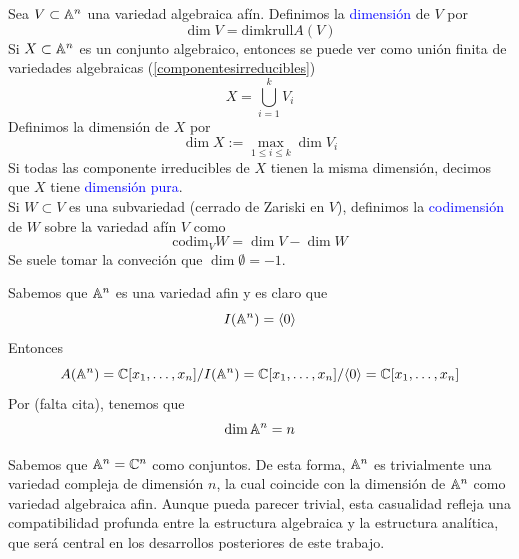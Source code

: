     \begin{definition}
        Sea $V\subset\mathbb{A}^n$ una variedad algebraica afín. Definimos la \textcolor{blue}{dimensión} de $V$ por
        \begin{equation*}
            \dim V = \mathrm{dimkrull}A(V)
        \end{equation*}
        Si $X\subset\mathbb{A}^n$ es un conjunto algebraico, entonces se puede ver como unión finita de variedades algebraicas (\ref{componentesirreducibles})
        \begin{equation*}
            X=\bigcup_{i=1}^k V_i
        \end{equation*}
        Definimos la dimensión de $X$ por
        \begin{equation*}
            \dim X:=\max_{1\leq i\leq k}\dim V_i
        \end{equation*}
        Si todas las componente irreducibles de $X$ tienen la misma dimensión, decimos que $X$ tiene \textcolor{blue}{dimensión pura}.\\
        Si $W\subset V$ es una subvariedad (cerrado de Zariski en $V$), definimos la \textcolor{blue}{codimensión} de $W$ sobre la variedad afín $V$ como
        \begin{equation*}
            \mathrm{codim}_{V} W=\dim V - \dim W
        \end{equation*}
        Se suele tomar la conveción que $\dim \emptyset =-1$.
    \end{definition}
    
    \begin{example}
        Sabemos que $\mathbb{A}^n$ es una variedad afin y es claro que
        \begin{equation*}
            I(\mathbb{A}^n)=\langle 0 \rangle
        \end{equation*}
        Entonces
        \begin{equation*}
             A(\mathbb{A}^n)=\mathbb{C}[x_1,\dots,x_n]/I(\mathbb{A}^n)=\mathbb{C}[x_1,\dots,x_n]/\langle 0 \rangle=\mathbb{C}[x_1,\dots,x_n]
        \end{equation*}
        Por (falta cita), tenemos que
        \begin{equation*}
            \dim \mathbb{A}^n = n
        \end{equation*}
    \end{example}

    Sabemos que $\mathbb{A}^n=\mathbb{C}^n$ como conjuntos. De esta forma, $\mathbb{A}^n$ es trivialmente una variedad compleja de dimensión $n$, la cual coincide con la dimensión de $\mathbb{A}^n$ como variedad algebraica afin. Aunque pueda parecer trivial, esta casualidad refleja una compatibilidad profunda entre la estructura algebraica y la estructura analítica, que será central en los desarrollos posteriores de este trabajo.

